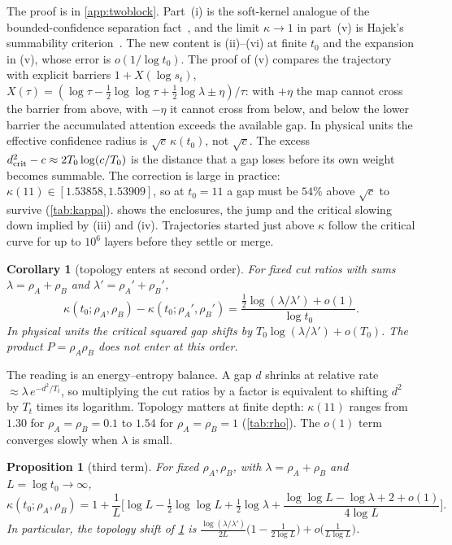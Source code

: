 \documentclass[10pt]{article}
\newtheorem{proposition}{Proposition}
\newtheorem{corollary}{Corollary}
\theoremstyle{definition}
\theoremstyle{remark}
\begin{document}
The proof is in \cref{app:twoblock}. Part~(i) is the soft-kernel analogue of the bounded-confidence separation
fact~\citep{blondel2009}, and the limit $\kappa\to1$ in part~(v) is Hajek's summability criterion~\citep{hajek1988}. The new content is
(ii)--(vi) at finite $t_0$ and the expansion in (v), whose error is $o(1/\log t_0)$. The proof of (v) compares the trajectory with explicit barriers
$1+X(\log s_t)$, $X(\tau)=(\log\tau-\frac12\log\log\tau+\frac12\log\lambda\pm\eta)/\tau$: with $+\eta$ the map cannot cross the barrier
from above, with $-\eta$ it cannot cross from below, and below the lower barrier the accumulated attention exceeds the available gap. In
physical units the effective confidence radius is $\sqrt c\,\kappa(t_0)$, not $\sqrt c$. The excess $d_{\rm crit}^2-c\approx2T_0\log(c/T_0)$
is the distance that a gap loses before its own weight becomes summable. The correction is large in practice: $\kappa(11)\in[1.53858,1.53909]$, so at $t_0=11$ a gap must be $54\%$ above
$\sqrt c$ to survive (\cref{tab:kappa}).  shows the enclosures, the jump and the critical slowing down implied by (iii)
and (iv). Trajectories started just above $\kappa$ follow the critical curve for up to $10^6$ layers before they settle or merge.

\begin{corollary}[topology enters at second order]\label{cor:topology}
For fixed cut ratios with sums $\lambda=\rho_A+\rho_B$ and $\lambda'=\rho_A'+\rho_B'$,
\[
\kappa(t_0;\rho_A,\rho_B)-\kappa(t_0;\rho_A',\rho_B')=\frac{\frac12\log(\lambda/\lambda')+o(1)}{\log t_0}.
\]
In physical units the critical squared gap shifts by $T_0\log(\lambda/\lambda')+o(T_0)$. The product $P=\rho_A\rho_B$ does not enter at this
order.
\end{corollary}

The reading is an energy--entropy balance. A gap $d$ shrinks at relative rate $\approx\lambda\,e^{-d^2/T_t}$, so multiplying the cut ratios by
a factor is equivalent to shifting $d^2$ by $T_t$ times its logarithm. Topology matters at finite depth: $\kappa(11)$ ranges from $1.30$ for
$\rho_A=\rho_B=0.1$ to $1.54$ for $\rho_A=\rho_B=1$ (\cref{tab:rho}). The $o(1)$ term converges slowly when $\lambda$ is small.

\begin{proposition}[third term]\label{prop:third}
For fixed $\rho_A,\rho_B$, with $\lambda=\rho_A+\rho_B$ and $L=\log t_0\to\infty$,
\[
\kappa(t_0;\rho_A,\rho_B)=1+\frac1L\Big[\log L-\tfrac12\log\log L+\tfrac12\log\lambda+\frac{\log\log L-\log\lambda+2+o(1)}{4\log L}\Big].
\]
In particular, the topology shift of \cref{cor:topology} is $\frac{\log(\lambda/\lambda')}{2L}\big(1-\frac1{2\log L}\big)+o\big(\frac1{L\log L}\big)$.
\end{proposition}
\end{document}
